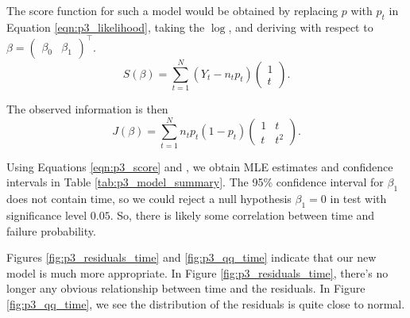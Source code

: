 \documentclass[letterpaper,11pt]{article}
\begin{document}
\begin{enumerate}
\begin{enumerate}
\begin{description}
        The score function for such a model would be obtained by replacing $p$
        with $p_t$ in Equation \ref{eqn:p3_likelihood}, taking the $\log$, and
        deriving with respect to $\beta = \begin{pmatrix} \beta_0 & \beta_1
        \end{pmatrix}^\intercal$.
        \begin{equation}
          S\left(\beta\right)
          = \sum_{t = 1}^N \left(
            Y_t - n_tp_t
          \right)
          \begin{pmatrix}
            1 \\
            t
          \end{pmatrix}.
          \label{eqn:p3_score}          
        \end{equation}

        The observed information is then
        \begin{equation}
          J\left(\beta\right)
          = \sum_{t=1}^N n_tp_t\left(1 - p_t\right)
          \begin{pmatrix}
            1 & t \\
            t & t^2
          \end{pmatrix}.
          \label{eqn:p3_observed_information}
        \end{equation}

        Using Equations \ref{eqn:p3_score}
        and \label{eqn:p3_observed_information}, we obtain MLE estimates and
        confidence intervals in Table \ref{tab:p3_model_summary}. The 95\%
        confidence interval for $\beta_1$ does not contain time, so we could
        reject a null hypothesis $\beta_1 = 0$ in test with significance level
        $0.05$. So, there is likely some correlation between time and failure
        probability.

        Figures \ref{fig:p3_residuals_time} and \ref{fig:p3_qq_time} indicate
        that our new model is much more appropriate. In Figure
        \ref{fig:p3_residuals_time}, there's no longer any obvious relationship
        between time and the residuals. In Figure \ref{fig:p3_qq_time}, we see
        the distribution of the residuals is quite close to normal.
      \end{description}


\end{enumerate}
\end{enumerate}
\end{document}

